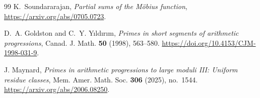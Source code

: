 \documentclass[11pt,a4paper]{article}
\numberwithin{equation}{section}
\begin{document}
{\begin{thebibliography}{99}
K.~Soundararajan,
\newblock \emph{Partial sums of the M\"obius function},
\newblock \url{https://arxiv.org/abs/0705.0723}.

D.~A. Goldston and C.~Y. Y{\i}ld{\i}r{\i}m,
\newblock \emph{Primes in short segments of arithmetic progressions},
\newblock Canad. J. Math. \textbf{50} (1998), 563--580.
\newblock \url{https://doi.org/10.4153/CJM-1998-031-9}.

J. Maynard,
\newblock \emph{Primes in arithmetic progressions to large moduli III:
Uniform residue classes},
\newblock Mem. Amer. Math. Soc. \textbf{306} (2025), no.~1544.
\newblock \url{https://arxiv.org/abs/2006.08250}.
\end{thebibliography}}
\end{document}
